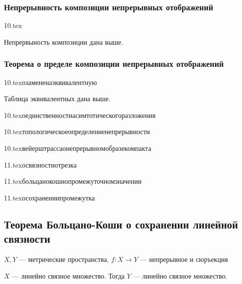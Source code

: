 
\subsubsection{Непрерывность композиции непрерывных отображений}


{10.tex}{}

Непрервыность композиции дана выше.

\subsubsection{Теорема о пределе композиции непрерывных отображений}


{10.tex}{озамененаэквивалентную}

Таблица эквивалентных дана выше. 

{10.tex}{оединственностиасимтотическогоразложения}

{10.tex}{топологическоеопределениенепрерывности}

{10.tex}{вейерштрассаонепрерывномобразекомпакта}


{11.tex}{освязностиотрезка}

{11.tex}{больцанокошиопромежуточномзначении}

{11.tex}{осохранениипромежутка}

\subsection{Теорема Больцано-Коши о сохранении линейной связности}

$X, Y$ --- метрические пространства, $f:X\to Y$ --- непрерывное и сюръекция

$X$ --- линейно связное множество. Тогда $Y$ --- линейно связное множество.

